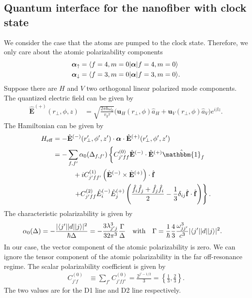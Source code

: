 \documentclass[preprint,aps,pra,onecolumn]{revtex4-1} %
\renewcommand{\tensor}[1]{\boldsymbol{#1}}
\begin{document}



\subsection{Quantum interface for the nanofiber with clock state}
We consider the case that the atoms are pumped to the clock state. Therefore, we only care about the atomic polarizability components
\begin{align}
\tensor{\alpha}_{\uparrow} &=\bra{f=4,m=0}\tensor{\alpha}\ket{f=4,m=0}\\
\tensor{\alpha}_{\downarrow} &=\bra{f=3,m=0}\tensor{\alpha}\ket{f=3,m=0}.
\end{align}
Suppose there are $H$ and $V$ two orthogonal linear polarized mode components. The quantized electric field can be given by
\begin{align}
\hat{\mathbf{E}}^{(+)}(r\!_\perp,\phi,z) &= \sqrt{ \frac{2 \pi \hbar \omega_0}{ v_g \tau} } \big( \mathbf{u}_H(r\!_\perp,\phi) \hat{a}_H + \mathbf{u}_V(r\!_\perp,\phi) \hat{a}_V \big) e^{i \beta z}.
\end{align}
The Hamiltonian can be given by
\begin{align}
H_{\rm eff}   &= -\hat{\mathbf{E}}^{(-)}(r^\prime\!\!_\perp,\phi',z')\cdot \tensor{\alpha}\cdot \hat{\mathbf{E}}^{(+)}(r^\prime\!\!_\perp,\phi',z')\\
 &=- \sum_{f,f'}\alpha_0(\Delta_{f,f'}) \left\{ C_{j'ff}^{(0)} \hat{\mathbf{E}}^{(-)} \cdot \hat{\mathbf{E}}^{(+)} \hat{\mathbbm{1}}_f \phantom{\frac{\hat{1}}{1}}\right. \nonumber\\
&\quad\quad\quad + i C_{j'ff'}^{(1)} \left(\hat{\mathbf{E}}^{(-)} \times \hat{\mathbf{E}}^{(+)} \right) \cdot \hat{ \mathbf{f}} \nonumber\\
&\quad\quad\quad  \left. + C_{j'ff}^{(2)} \hat{E}_i^{(-)} \hat{E}_j^{(+)} \left( \frac{ \hat{f}_i \hat{f}_j  + \hat{f}_j \hat{f}_i  }{2} - \frac{1}{3}\delta_{ij} \hat{ \mathbf{f}} \cdot \hat{\mathbf{f}}  \right) \right\}. 
\end{align}
The characteristic polarizability is given by
\begin{align} \label{Eq::alpha0}
\alpha_0(\Delta) & =  -\frac{|  \langle{ j' }\rvert| d | \lvert{ j }\rangle |^2}{\hbar \Delta } = - \frac{3 \lambda_{j' j}^3}{32 \pi^3} \frac{ \Gamma }{ \Delta }\quad \text{with}\quad 
\Gamma = \frac{1}{\hbar} \frac{4}{3} \frac{\omega_{j j'}^3}{c^3} | \langle{ j' }\rvert| d | \lvert{ j }\rangle |^2.
\end{align}
In our case, the vector component of the atomic polarizability is zero. We can ignore the tensor component of the atomic polarizability in the far off-resonance regime. The scalar polarizability coefficient is given by
\begin{align} \label{Eq::alpha0}
C_{j' f}^{(0)} &\equiv \sum_{f'} C_{j' f f'}^{(0)} =   \frac{2^{j'-1/2}}{3} =\left\{ \frac{1}{3},\frac{2}{3}\right\}.
\end{align}
The two values are for the D1 line and D2 line respectively.
\end{document}
